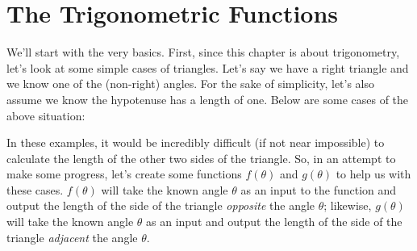 \documentclass[lang=en,11pt]{elegantbook}
\begin{document}
\section{The Trigonometric Functions}
\noindent We’ll start with the very basics. First, since this chapter is about trigonometry, let’s look at some simple cases of triangles. Let’s say we have a right triangle and we know one of the (non-right) angles. For the sake of simplicity, let’s also assume we know the hypotenuse has a length of one. Below are some cases of the above situation:
\begin{figure}[!h]
    \centering
    \hspace{0.5cm}
    \hspace{0.5cm}
\end{figure}
In these examples, it would be incredibly difficult (if not near impossible) to calculate the length of the other two sides of the triangle. So, in an attempt to make some progress, let’s create some functions $f(\theta)$ and $g(\theta)$ to help us with these cases. $f(\theta)$ will take the known angle $\theta$ as an input to the function and output the length of the side of the triangle \textit{opposite} the angle $\theta$; likewise, $g(\theta)$ will take the known angle $\theta$ as an input and output the length of the side of the triangle \textit{adjacent} the angle $\theta$.
\end{document}
